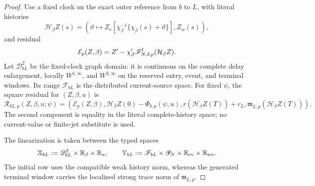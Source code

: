 \begin{proof}
Use a fixed clock on the exact outer reference from \(b\) to \(L\), with
literal histories
\begin{equation}
 \mathcal H_\beta Z(s)
 =\left(\vartheta\mapsto
 Z_v\!\left[\chi_\beta^{-1}
       \{\chi_\beta(s)+\vartheta\}\right],Z_w(s)\right),       \label{eq:anchor-b-literal-history}
\end{equation}
and residual
\begin{equation}
 \mathcal E_p(Z,\beta)
 =Z'-\chi_\beta'\mathscr F^{\rm f}_{N,\delta,p}
       (\mathcal H_\beta Z).                       \label{eq:anchor-b-fixed-clock-residual}
\end{equation}
Let \(\mathscr D_{bL}^2\) be the fixed-clock graph domain: it is continuous
on the complete delay enlargement, locally \(W^{1,\infty}\), and
\(W^{2,\infty}\) on the reserved entry, event, and terminal windows.  Its
range \(\mathscr F_{bL}\) is the distributed current-source space.  For
fixed \(\psi\), the square residual for \((Z,\beta,u)\) is
\begin{equation}
 \mathscr R_{bL,p}(Z,\beta,u;\psi)
 =\left(
   \mathcal E_p(Z,\beta),
   \mathcal H_\beta Z(0)-\Phi_{b,p}(\psi,u),
   r(\mathcal H_\beta Z(T))+r_L,
   \mathfrak m_{L,p}(\mathcal H_\beta Z(T))
  \right).                                         \label{eq:anchor-b-sheet-residual}
\end{equation}
The second component is equality in the literal complete-history space;
no current-value or finite-jet substitute is used.

The linearization is taken between the typed spaces
\begin{equation}
 \mathbb X_{bL}
 :=\mathscr D_{bL}^2\times\mathbb R_\beta\times\mathbb R_u,
 \qquad
 \mathbb Y_{bL}
 :=\mathscr F_{bL}\times\mathscr Y_N
       \times\mathbb R_{\rm ev}\times\mathbb R_{\rm ter}.
                                                               \label{eq:anchor-bL-typed-spaces}
\end{equation}
The initial row uses the compatible weak history norm, whereas the generated
terminal window carries the localized strong trace norm of
\(\mathfrak m_{L,p}\).


\end{proof}

